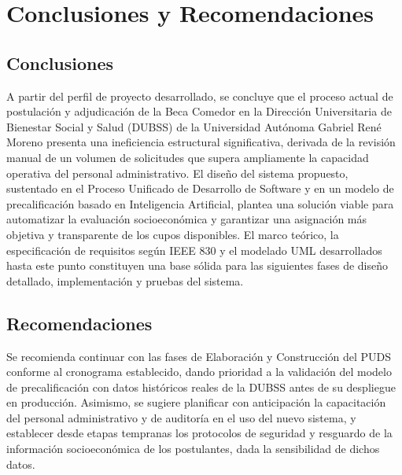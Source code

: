 \newpage
\section*{\normalfont\textbf{Conclusiones y Recomendaciones}}

\subsection*{\normalfont\textbf{Conclusiones}}


A partir del perfil de proyecto desarrollado, se concluye que el proceso actual de postulación y adjudicación de la Beca Comedor en la Dirección Universitaria de Bienestar Social y Salud (DUBSS) de la Universidad Autónoma Gabriel René Moreno presenta una ineficiencia estructural significativa, derivada de la revisión manual de un volumen de solicitudes que supera ampliamente la capacidad operativa del personal administrativo. El diseño del sistema propuesto, sustentado en el Proceso Unificado de Desarrollo de Software y en un modelo de precalificación basado en Inteligencia Artificial, plantea una solución viable para automatizar la evaluación socioeconómica y garantizar una asignación más objetiva y transparente de los cupos disponibles. El marco teórico, la especificación de requisitos según IEEE 830 y el modelado UML desarrollados hasta este punto constituyen una base sólida para las siguientes fases de diseño detallado, implementación y pruebas del sistema.

\subsection*{\normalfont\textbf{Recomendaciones}}


Se recomienda continuar con las fases de Elaboración y Construcción del PUDS conforme al cronograma establecido, dando prioridad a la validación del modelo de precalificación con datos históricos reales de la DUBSS antes de su despliegue en producción. Asimismo, se sugiere planificar con anticipación la capacitación del personal administrativo y de auditoría en el uso del nuevo sistema, y establecer desde etapas tempranas los protocolos de seguridad y resguardo de la información socioeconómica de los postulantes, dada la sensibilidad de dichos datos.
